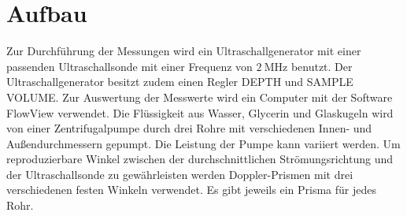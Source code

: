 \section{Aufbau}
\label{sec:Aufbau}
Zur Durchführung der Messungen wird ein Ultraschallgenerator mit einer passenden Ultraschallsonde mit einer Frequenz von $\SI{2}{\mega\hertz}$ benutzt. Der Ultraschallgenerator besitzt zudem einen Regler DEPTH und SAMPLE VOLUME. Zur Auswertung der Messwerte wird ein Computer mit der Software FlowView verwendet. Die Flüssigkeit aus Wasser, Glycerin und Glaskugeln wird von einer Zentrifugalpumpe durch drei Rohre mit verschiedenen Innen- und Außendurchmessern gepumpt. Die Leistung der Pumpe kann variiert werden. Um reproduzierbare Winkel zwischen der durchschnittlichen Strömungsrichtung und der Ultraschallsonde zu gewährleisten werden Doppler-Prismen mit drei verschiedenen festen Winkeln verwendet. Es gibt jeweils ein Prisma für jedes Rohr.